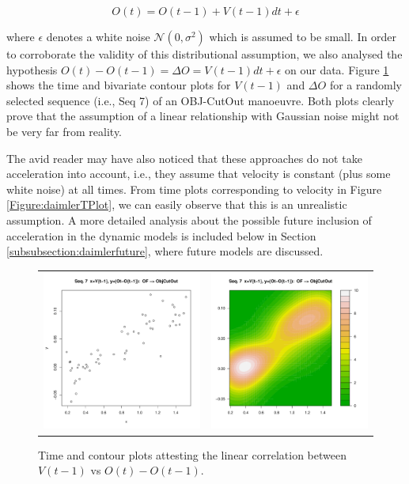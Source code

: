 \begin{equation}
O(t) =O(t-1) +V(t-1)dt +\epsilon
\end{equation}

where $\epsilon$ denotes a white noise $\mathcal{N}(0,\sigma^2)$ which is assumed to be small. In order to corroborate the validity of this distributional assumption, we also analysed the hypothesis $O(t) - O(t-1) = \Delta O = V(t-1)dt +\epsilon$ on our data. Figure \ref{Figure:daimlerVvsOffs} shows the time and bivariate contour plots for $V(t-1)$ and $\Delta O$ for a randomly selected sequence (i.e., Seq 7) of an OBJ-CutOut manoeuvre. Both plots clearly prove that the assumption of a linear relationship with Gaussian noise might not be very far from reality.

The avid reader may have also noticed that these approaches do not take acceleration into account, i.e., they assume that velocity is constant (plus some white noise) at all times. From time plots corresponding to velocity in Figure \ref{Figure:daimlerTPlot}, we can easily observe that this is an unrealistic assumption. A more detailed analysis about the possible future inclusion of acceleration in the dynamic models is included below in Section \ref{subsubsection:daimlerfuture}, where future models are discussed.

\begin{figure}[ht!]
  \centering
  \setlength{\tabcolsep}{0.05pt}
  \renewcommand{\arraystretch}{0.02}
    \begin{tabular}{cc}
    \includegraphics[width=60mm]{figures/DaimlerOBJplotSerie7.pdf}&
    \includegraphics[width=60mm]{figures/DaimlerOBJcontourSerie7.pdf}\\
  \end{tabular}
      \caption{ \label{Figure:daimlerVvsOffs}Time and contour plots attesting the linear correlation between $V(t-1)$ vs $O(t) - O(t-1)$.}
\end{figure}

